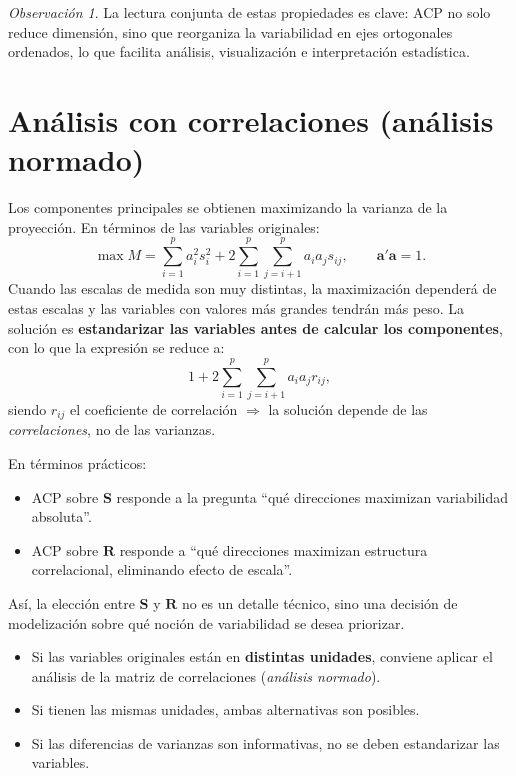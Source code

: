 \documentclass[12pt, a4paper]{article}
\theoremstyle{plain}
\theoremstyle{definition}
\theoremstyle{remark}
\newtheorem*{observacion}{Observación}
\newcommand{\mat}[1]{\mathbf{#1}}
\begin{document}
\begin{observacion}
La lectura conjunta de estas propiedades es clave: ACP no solo reduce
dimensión, sino que reorganiza la variabilidad en ejes ortogonales ordenados,
lo que facilita análisis, visualización e interpretación estadística.
\end{observacion}

\section{Análisis con correlaciones (análisis normado)}

Los componentes principales se obtienen maximizando la varianza de la
proyección. En términos de las variables originales:
\[
  \max M = \sum_{i=1}^p a_i^2 s_i^2
  + 2\sum_{i=1}^p\sum_{j=i+1}^p a_i a_j s_{ij}, \qquad \mathbf{a}'\mathbf{a}=1.
\]
Cuando las escalas de medida son muy distintas, la maximización dependerá de
estas escalas y las variables con valores más grandes tendrán más peso. La
solución es \textbf{estandarizar las variables antes de calcular los
componentes}, con lo que la expresión se reduce a:
\[
  1 + 2\sum_{i=1}^p\sum_{j=i+1}^p a_i a_j r_{ij},
\]
siendo $r_{ij}$ el coeficiente de correlación $\Rightarrow$ la solución
depende de las \emph{correlaciones}, no de las varianzas.

En términos prácticos:
\begin{itemize}
  \item ACP sobre $\mat{S}$ responde a la pregunta ``qué direcciones maximizan
        variabilidad absoluta''.
  \item ACP sobre $\mat{R}$ responde a ``qué direcciones maximizan estructura
        correlacional, eliminando efecto de escala''.
\end{itemize}

Así, la elección entre $\mat{S}$ y $\mat{R}$ no es un detalle técnico, sino
una decisión de modelización sobre qué noción de variabilidad se desea
priorizar.

\begin{mdframed}[style=resultado]
\begin{itemize}
  \item Si las variables originales están en \textbf{distintas unidades},
        conviene aplicar el análisis de la matriz de correlaciones
        (\emph{análisis normado}).
  \item Si tienen las mismas unidades, ambas alternativas son posibles.
  \item Si las diferencias de varianzas son informativas, no se deben
        estandarizar las variables.
\end{itemize}
\end{mdframed}
\end{document}
